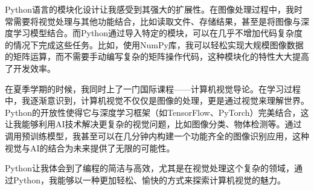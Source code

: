 \documentclass{article}
\begin{document}
Python语言的模块化设计让我感受到其强大的扩展性。在图像处理过程中，我时常需要将视觉处理与其他功能结合，比如读取文件、存储结果，甚至是将图像与深度学习模型结合。而Python通过导入特定的模块，可以在几乎不增加代码复杂度的情况下完成这些任务。比如，使用NumPy库，我可以轻松实现大规模图像数据的矩阵运算，而不需要手动编写复杂的矩阵操作代码，这种模块化的特性大大提高了开发效率。

在夏季学期的时候，我同时上了一门国际课程——计算机视觉导论。在学习过程中，我逐渐意识到，计算机视觉不仅仅是图像的处理，更是通过视觉来理解世界。Python的开放性使得它与深度学习框架（如TensorFlow、PyTorch）完美结合，这让我能够利用AI技术解决更复杂的视觉问题，比如图像分类、物体检测等。通过调用预训练模型，我甚至可以在几分钟内构建一个功能齐全的图像识别应用，这种视觉与AI的结合为未来提供了无限的可能性。

Python让我体会到了编程的简洁与高效，尤其是在视觉处理这个复杂的领域，通过Python，我能够以一种更加轻松、愉快的方式来探索计算机视觉的魅力。
\end{document}

